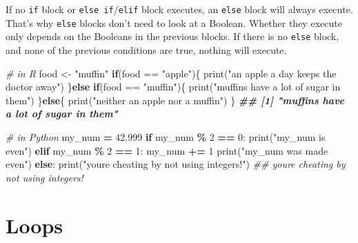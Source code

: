 \documentclass[
  12pt,
  krantz2]{krantz}
\makeatletter
\newenvironment{Shaded}{\begin{snugshade}}{\end{snugshade}}
\newcommand{\BuiltInTok}[1]{#1}
\newcommand{\CommentTok}[1]{\textcolor[rgb]{0.37,0.37,0.37}{\textit{#1}}}
\newcommand{\ControlFlowTok}[1]{\textcolor[rgb]{0.27,0.27,0.27}{\textbf{#1}}}
\newcommand{\DecValTok}[1]{\textcolor[rgb]{0.06,0.06,0.06}{#1}}
\newcommand{\DocumentationTok}[1]{\textcolor[rgb]{0.37,0.37,0.37}{\textbf{\textit{#1}}}}
\newcommand{\FloatTok}[1]{\textcolor[rgb]{0.06,0.06,0.06}{#1}}
\newcommand{\FunctionTok}[1]{\textcolor[rgb]{0,0,0}{#1}}
\newcommand{\NormalTok}[1]{#1}
\newcommand{\OperatorTok}[1]{\textcolor[rgb]{0.43,0.43,0.43}{\textbf{#1}}}
\newcommand{\OtherTok}[1]{\textcolor[rgb]{0.37,0.37,0.37}{#1}}
\newcommand{\SpecialCharTok}[1]{\textcolor[rgb]{0,0,0}{#1}}
\newcommand{\StringTok}[1]{\textcolor[rgb]{0.5,0.5,0.5}{#1}}
\newenvironment{kframe}{%
\medskip{}
\setlength{\fboxsep}{.8em}
 \def\at@end@of@kframe{}%
 \ifinner\ifhmode%
  \def\at@end@of@kframe{\end{minipage}}%
  \begin{minipage}{\columnwidth}%
 \fi\fi%
 \def\FrameCommand##1{\hskip\@totalleftmargin \hskip-\fboxsep
 \colorbox{shadecolor}{##1}\hskip-\fboxsep
     \hskip-\linewidth \hskip-\@totalleftmargin \hskip\columnwidth}%
 \MakeFramed {\advance\hsize-\width
   \@totalleftmargin\z@ \linewidth\hsize
   \@setminipage}}%
 {\par\unskip\endMakeFramed%
 \at@end@of@kframe}
\renewenvironment{Shaded}{\begin{kframe}}{\end{kframe}}
\makeatother
\begin{document}
If no \texttt{if} block or \texttt{else\ if}/\texttt{elif} block executes, an \texttt{else} block will always execute. That's why \texttt{else} blocks don't need to look at a Boolean. Whether they execute only depends on the Booleans in the previous blocks. If there is no \texttt{else} block, and none of the previous conditions are true, nothing will execute.

\begin{Shaded}
\begin{Highlighting}[]
\CommentTok{\# in R}
\NormalTok{food }\OtherTok{\textless{}{-}} \StringTok{"muffin"}
\ControlFlowTok{if}\NormalTok{(food }\SpecialCharTok{==} \StringTok{"apple"}\NormalTok{)\{}
    \FunctionTok{print}\NormalTok{(}\StringTok{"an apple a day keeps the doctor away"}\NormalTok{)}
\NormalTok{\}}\ControlFlowTok{else} \ControlFlowTok{if}\NormalTok{(food }\SpecialCharTok{==} \StringTok{"muffin"}\NormalTok{)\{}
    \FunctionTok{print}\NormalTok{(}\StringTok{"muffins have a lot of sugar in them"}\NormalTok{)}
\NormalTok{\}}\ControlFlowTok{else}\NormalTok{\{}
    \FunctionTok{print}\NormalTok{(}\StringTok{"neither an apple nor a muffin"}\NormalTok{)}
\NormalTok{\}}
\DocumentationTok{\#\# [1] "muffins have a lot of sugar in them"}
\end{Highlighting}
\end{Shaded}

\begin{Shaded}
\begin{Highlighting}[]
\CommentTok{\# in Python}
\NormalTok{my\_num }\OperatorTok{=} \FloatTok{42.999}
\ControlFlowTok{if}\NormalTok{ my\_num }\OperatorTok{\%} \DecValTok{2} \OperatorTok{==} \DecValTok{0}\NormalTok{:}
    \BuiltInTok{print}\NormalTok{(}\StringTok{"my\_num is even"}\NormalTok{)}
\ControlFlowTok{elif}\NormalTok{ my\_num }\OperatorTok{\%} \DecValTok{2} \OperatorTok{==} \DecValTok{1}\NormalTok{:}
\NormalTok{    my\_num }\OperatorTok{+=} \DecValTok{1}
    \BuiltInTok{print}\NormalTok{(}\StringTok{"my\_num was made even"}\NormalTok{)}
\ControlFlowTok{else}\NormalTok{:}
    \BuiltInTok{print}\NormalTok{(}\StringTok{"you\textquotesingle{}re cheating by not using integers!"}\NormalTok{)}
\CommentTok{\#\# you\textquotesingle{}re cheating by not using integers!}
\end{Highlighting}
\end{Shaded}

\hypertarget{loops}{%
\section{Loops}\label{loops}}
\end{document}
